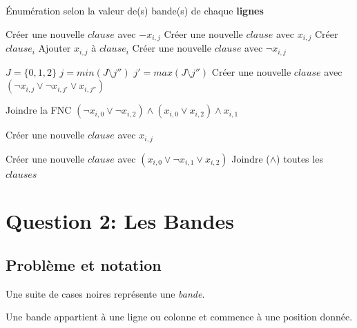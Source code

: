 \documentclass[a4paper,12pt]{report}
\begin{document}
\begin{algorithm}
\caption{Énumération selon la valeur de(s) bande(s) de chaque \textbf{lignes}}
\begin{algorithmic}
		 
				\State Créer une nouvelle $clause$ avec $-x_{i,j}$
				\State Créer une nouvelle $clause$ avec $x_{i,j}$
			\EndIf
		\EndFor
		 
				\State Créer $clause_i$
			\EndIf
			\State Ajouter $x_{i,j}$ à $clause_i$ 
		\EndFor
			 
					\State	Créer une nouvelle $clause$ avec $\lnot x_{i,j} $
				\EndFor
	
			 
			\State $J=\{0,1,2\}$
					\State $j=min(J\setminus j'')$
					\State $j'=max(J\setminus j'')$ 
					\State Créer une nouvelle $clause$ avec $(\lnot x_{i,j}\vee \lnot x_{i,j'} \vee x_{i,j''} )$ 
				\EndFor
							
			 
				\State Joindre la FNC $(\lnot x_{i,0} \vee \lnot x_{i,2}) \wedge (x_{i,0} \vee x_{i,2}) \wedge x_{i,1}$
							
			 
							\State Créer une nouvelle $clause$ avec $x_{i,j}$
				\EndFor
							
			\EndIf
			\State Créer une nouvelle $clause$ avec $(x_{i,0} \vee \lnot x_{i,1} \vee x_{i,2})$
		\EndIf			 
		\State Joindre ($\wedge$) toutes les $clauses$
\EndFor
\end{algorithmic}
\end{algorithm}


\chapter{Question 2: Les Bandes}
\section{Problème et notation}

Une suite de cases noires représente une \textit{bande}. 

Une bande appartient à une ligne ou colonne et commence à une position donnée. 
\end{document}
